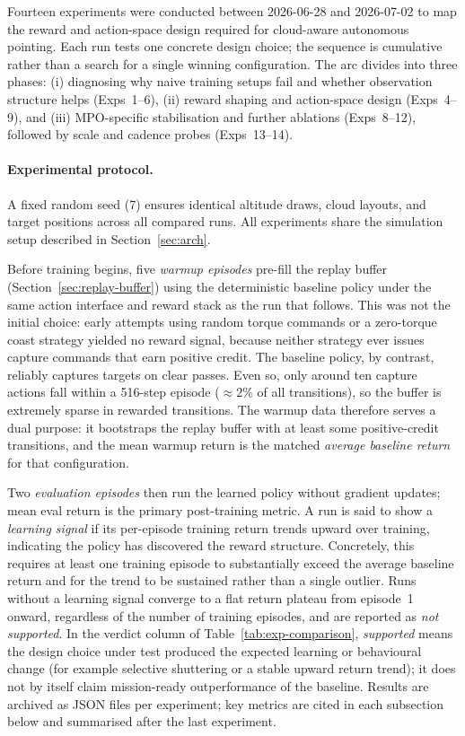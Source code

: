 \label{sec:experiments}

Fourteen experiments were conducted between 2026-06-28 and 2026-07-02 to map the reward and action-space design required for cloud-aware autonomous pointing.
Each run tests one concrete design choice; the sequence is cumulative rather than a search for a single winning configuration.
The arc divides into three phases: (i) diagnosing why naive training setups fail and whether observation structure helps (Exps~1--6),
(ii) reward shaping and action-space design (Exps~4--9), and
(iii) MPO-specific stabilisation and further ablations (Exps~8--12), followed by scale and cadence probes (Exps~13--14).

\paragraph{Experimental protocol.}
\label{sec:exp-protocol}
A fixed random seed (7) ensures identical altitude draws, cloud layouts, and target positions across all compared runs.
All experiments share the simulation setup described in Section~\ref{sec:arch}.

Before training begins, five \emph{warmup episodes} pre-fill the replay buffer (Section~\ref{sec:replay-buffer}) using the deterministic baseline policy under the same action interface and reward stack as the run that follows.
This was not the initial choice: early attempts using random torque commands or a zero-torque coast strategy yielded no reward signal, because neither strategy ever issues capture commands that earn positive credit.
The baseline policy, by contrast, reliably captures targets on clear passes.
Even so, only around ten capture actions fall within a 516-step episode ($\approx 2\%$ of all transitions), so the buffer is extremely sparse in rewarded transitions.
The warmup data therefore serves a dual purpose: it bootstraps the replay buffer with at least some positive-credit transitions, and the mean warmup return is the matched \emph{average baseline return} for that configuration.

Two \emph{evaluation episodes} then run the learned policy without gradient updates; mean eval return is the primary post-training metric.
A run is said to show a \emph{learning signal} if its per-episode training return trends upward over training, indicating the policy has discovered the reward structure.
Concretely, this requires at least one training episode to substantially exceed the average baseline return and for the trend to be sustained rather than a single outlier.
Runs without a learning signal converge to a flat return plateau from episode~1 onward, regardless of the number of training episodes, and are reported as \emph{not supported}.
In the verdict column of Table~\ref{tab:exp-comparison}, \emph{supported} means the design choice under test produced the expected learning or behavioural change (for example selective shuttering or a stable upward return trend); it does not by itself claim mission-ready outperformance of the baseline.
Results are archived as JSON files per experiment; key metrics are cited in each subsection below and summarised after the last experiment.

